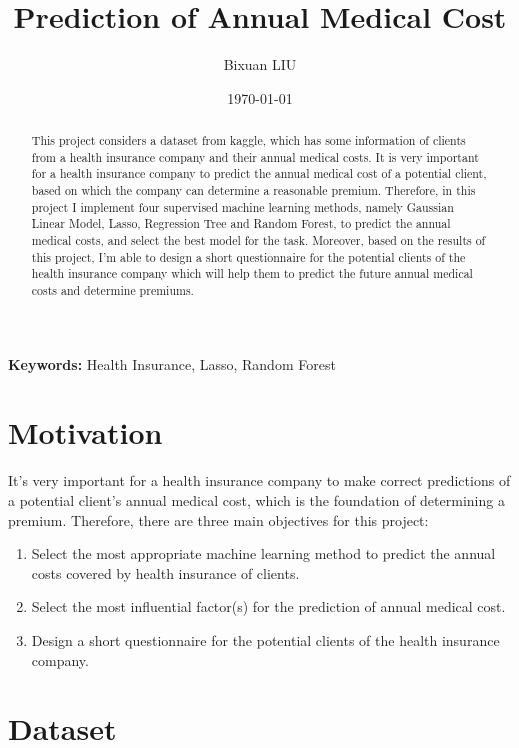 \documentclass{article}
\title{Prediction of Annual Medical Cost}
\author{Bixuan LIU}
\date{\today}
\begin{document}
\maketitle
	
\begin{abstract}

This project considers a dataset from kaggle, which has some information of clients from a health insurance company and their annual medical costs. It is very important for a health insurance company to predict the annual medical cost of a potential client, based on which the company can determine a reasonable premium. Therefore, in this project I implement four supervised machine learning methods, namely Gaussian Linear Model, Lasso, Regression Tree and Random Forest, to predict the annual medical costs, and select the best model for the task. Moreover, based on the results of this project, I'm able to design a short questionnaire for the potential clients of the health insurance company which will help them to predict the future annual medical costs and determine premiums.

\end{abstract}

\textbf{Keywords: } Health Insurance, Lasso, Random Forest

\newpage
\tableofcontents
\newpage

\section{Motivation}

It's very important for a health insurance company to make correct predictions of a potential client's annual medical cost, which is the foundation of determining a premium. Therefore, there are three main objectives for this project:
\begin{enumerate}
	\item Select the most appropriate machine learning method to predict the annual costs covered by health insurance of clients.
	\item Select the most influential factor(s) for the prediction of annual medical cost.
	\item Design a short questionnaire for the potential clients of the health insurance company.
\end{enumerate}

\section{Dataset}
\end{document}
